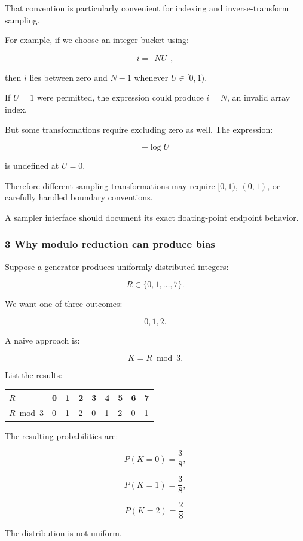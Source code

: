That convention is particularly convenient for indexing and inverse-transform sampling.

For example, if we choose an integer bucket using:

\[
 i=\lfloor NU\rfloor,
\]

then \(i\) lies between zero and \(N-1\) whenever \(U\in[0,1)\).

If \(U=1\) were permitted, the expression could produce \(i=N\), an invalid array index.

But some transformations require excluding zero as well. The expression:

\[
 -\log U
\]

is undefined at \(U=0\).

Therefore different sampling transformations may require \([0,1)\), \((0,1)\), or carefully handled boundary conventions.

A sampler interface should document its exact floating-point endpoint behavior.

\subsubsection{3 Why modulo reduction can produce bias}\label{02-foundations-ii-ch029-why-modulo-reduction-can-produce-bias}

Suppose a generator produces uniformly distributed integers:

\[
 R\in\{0,1,\ldots,7\}.
\]

We want one of three outcomes:

\[
 0,1,2.
\]

A naive approach is:

\[
 K=R\bmod3.
\]

List the results:

{\def\LTcaptype{none} %
\begin{longtable}[]{@{}lllllllll@{}}
\toprule\noalign{}
\(R\) & 0 & 1 & 2 & 3 & 4 & 5 & 6 & 7 \\
\midrule\noalign{}
\endhead
\bottomrule\noalign{}
\endlastfoot
\(R\bmod3\) & 0 & 1 & 2 & 0 & 1 & 2 & 0 & 1 \\
\end{longtable}
}

The resulting probabilities are:

\[
 P(K=0)=\frac38,
\]

\[
 P(K=1)=\frac38,
\]

\[
 P(K=2)=\frac28.
\]

The distribution is not uniform.

